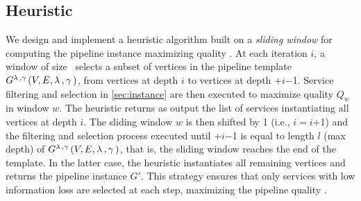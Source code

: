\subsection{Heuristic}\label{subsec:heuristics}
We design and implement a heuristic algorithm built on a \emph{sliding window} for computing the pipeline instance maximizing quality \q.
At each iteration $i$, a window of size \windowsize\ selects a subset of vertices in the pipeline template $G^{\lambda\,,\gamma\,}(V,E,\lambda\,,\gamma\,)$, from vertices at depth $i$ to vertices at depth \windowsize$+$$i$$-$1.
Service filtering and selection in \cref{sec:instance} are then executed to maximize quality $Q_w$ in window $w$. The heuristic returns as output the list of services instantiating all vertices at depth $i$. The sliding window $w$ is then shifted by 1 (i.e., $i$$=$$i$+1) and the filtering and selection process executed until \windowsize$+$$i$$-$1 is equal to length $l$ (max depth) of $G^{\lambda\,,\gamma\,}(V,E,\lambda\,,\gamma\,)$, that is, the sliding window reaches the end of the template. In the latter case, the heuristic instantiates all remaining vertices and returns the pipeline instance $G'$.
This strategy ensures that only services with low information loss are selected at each step, maximizing the pipeline quality \q.
\newenvironment{redtext}{\footnotesize	\color{gray}}{~~}
